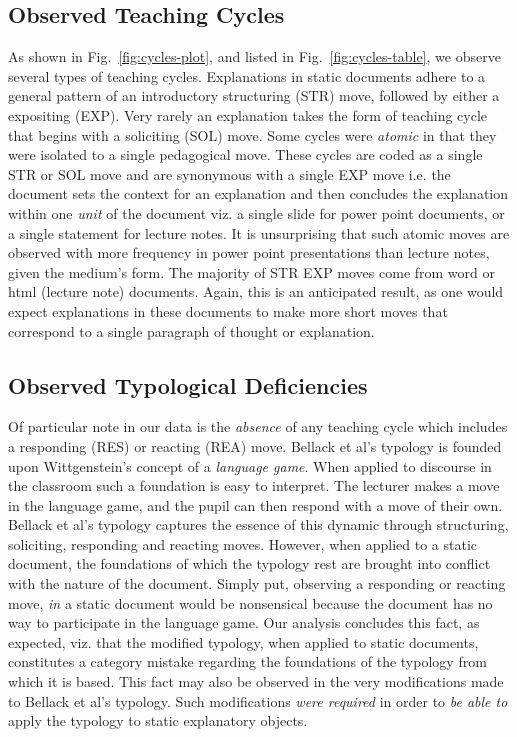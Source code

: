 \documentclass[conference]{IEEEtran}
\begin{document}
\subsection{Observed Teaching Cycles}
As shown in Fig.~\ref{fig:cycles-plot}, and listed in
Fig.~\ref{fig:cycles-table}, we observe several types of teaching cycles.
Explanations in static documents adhere to a general pattern of an introductory
structuring (STR) move, followed by either a expositing (EXP). Very rarely an
explanation takes the form of teaching cycle that begins with a soliciting (SOL)
move. Some cycles were \emph{atomic} in that they were isolated to a single
pedagogical move. These cycles are coded as a single STR or SOL move and are
synonymous with a single EXP move i.e. the document sets the context for an
explanation and then concludes the explanation within one \emph{unit} of the
document viz. a single slide for power point documents, or a single statement
for lecture notes. It is unsurprising that such atomic moves are observed with
more frequency in power point presentations than lecture notes, given the
medium's form. The majority of STR EXP moves come from word or html (lecture
note) documents. Again, this is an anticipated result, as one would expect
explanations in these documents to make more short moves that correspond to a
single paragraph of thought or explanation.

\subsection{Observed Typological Deficiencies}
Of particular note in our data is the \emph{absence} of any teaching cycle which
includes a responding (RES) or reacting (REA) move. Bellack et al's typology is
founded upon Wittgenstein's concept of a \emph{language game}. When applied to
discourse in the classroom such a foundation is easy to interpret. The lecturer
makes a move in the language game, and the pupil can then respond with a move of
their own. Bellack et al's typology captures the essence of this dynamic through
structuring, soliciting, responding and reacting moves. However, when applied to
a static document, the foundations of which the typology rest are brought into
conflict with the nature of the document. Simply put, observing a responding or
reacting move, \emph{in} a static document would be nonsensical because the
document has no way to participate in the language game. Our analysis concludes
this fact, as expected, viz. that the modified typology, when applied to static
documents, constitutes a category mistake regarding the foundations of the
typology from which it is based. This fact may also be observed in the very
modifications made to Bellack et al's typology. Such modifications \emph{were
  required} in order to \emph{be able to} apply the typology to static
explanatory objects.
\end{document}
